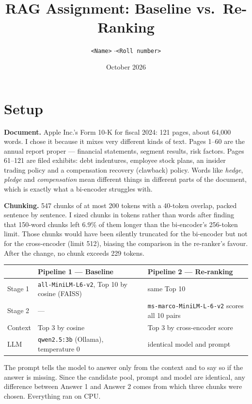\documentclass[10pt,a4paper]{article}
\title{\vspace{-1.4cm}\textbf{RAG Assignment: Baseline vs.\ Re-Ranking}}
\author{\texttt{<Name>} \quad$\cdot$\quad \texttt{<Roll number>}}
\date{October 2026}
\begin{document}
\maketitle
\vspace{-0.9cm}

\section*{Setup}

\textbf{Document.} Apple Inc.'s Form 10-K for fiscal 2024: 121 pages, about 64,000 words.
I chose it because it mixes very different kinds of text. Pages 1--60 are the annual report
proper --- financial statements, segment results, risk factors. Pages 61--121 are filed
exhibits: debt indentures, employee stock plans, an insider trading policy and a
compensation recovery (clawback) policy. Words like \emph{hedge}, \emph{pledge} and
\emph{compensation} mean different things in different parts of the document, which is
exactly what a bi-encoder struggles with.

\textbf{Chunking.} 547 chunks of at most 200 tokens with a 40-token overlap, packed sentence
by sentence. I sized chunks in tokens rather than words after finding that 150-word chunks
left 6.9\% of them longer than the bi-encoder's 256-token limit. Those chunks would have
been silently truncated for the bi-encoder but not for the cross-encoder (limit 512),
biasing the comparison in the re-ranker's favour. After the change, no chunk exceeds 229
tokens.

\begin{center}\small
\begin{tabular}{lll}
\toprule
 & \textbf{Pipeline 1 --- Baseline} & \textbf{Pipeline 2 --- Re-ranking} \\
\midrule
Stage 1 & \texttt{all-MiniLM-L6-v2}, Top 10 by cosine (FAISS) & same Top 10 \\
Stage 2 & --- & \texttt{ms-marco-MiniLM-L-6-v2} scores all 10 pairs \\
Context & Top 3 by cosine & Top 3 by cross-encoder score \\
LLM & \texttt{qwen2.5:3b} (Ollama), temperature 0 & identical model and prompt \\
\bottomrule
\end{tabular}
\end{center}

The prompt tells the model to answer only from the context and to say so if the answer is
missing. Since the candidate pool, prompt and model are identical, any difference between
Answer 1 and Answer 2 comes from which three chunks were chosen. Everything ran on CPU.
\end{document}
